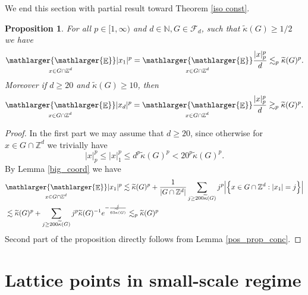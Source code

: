 \documentclass[a4paper,oneside, reqno]{amsart}
\numberwithin{equation}{section}
\newtheorem{Prop}[Thm]{Proposition}
\theoremstyle{definition}%
\theoremstyle{definition}
\theoremstyle{definition}%
\theoremstyle{definition}
\newcommand{\E}{\mathop{\mathbb{E}}}
\newcommand{\Z}{\mathbb{Z}}
\newcommand{\N}{\mathbb{N}}
\newcommand{\se}[1]{\underset{_{\substack{#1}}}{\mathlarger{\mathlarger{\E}}}}
\begin{document}
We end this section with partial result toward Theorem \ref{iso const}.
\begin{Prop} \label{concen medium}
     For all $p \in [1,\infty)$ and $d \in \N, G \in \mathcal{F}_d$, such that $\widetilde{\kappa}(G) \ge 1/2$ we have
    \[
    \se{x \in G \cap \Z^d} |x_1|^p= \se{x \in G \cap \Z^d} \frac{|x|_p^p}{d} \lesssim_{p} \widetilde{\kappa}(G)^p.
    \]
    Moreover if $d \ge 20$ and $\widetilde{\kappa}(G) \ge 10$, then
    \[
   \se{x \in G \cap \Z^d} |x_d|^p= \se{x \in G \cap \Z^d} \frac{|x|_p^p}{d} \gtrsim_{p} \widetilde{\kappa}(G)^p.
    \]
\end{Prop}
\begin{proof}
    In the first part we may assume that $d \ge 20$, since otherwise for $x \in G \cap \Z^d$ we trivially have
    \[
    |x|_p^p \le |x|_1^p \le d^p \widetilde{\kappa}(G)^p <20^p\widetilde{\kappa}(G)^p.
    \]
    By Lemma \ref{big_coord} we have 
    \begin{align*}
        &\se{x \in G \cap \Z^d} |x_1|^p \lesssim \widetilde{\kappa}(G)^p+  \frac{1}{|G \cap \Z^d|}\sum_{j \ge 200 \widetilde{\kappa}(G)} j^p \Big|\Big\{ x \in G \cap \Z^d: |x_1|=j \Big\}\Big| \\
        &\lesssim\widetilde{\kappa}(G)^p+\sum_{j \ge 200 \widetilde{\kappa}(G)} j^p \widetilde{\kappa}(G)^{-1} e^{-\frac{j}{63 \widetilde{\kappa}(G)}} \lesssim_p \widetilde{\kappa}(G)^p
    \end{align*}
    Second part of the proposition directly follows from Lemma \ref{pos_prop_conc}.
\end{proof}




\section{Lattice points in small-scale regime}
\end{document}
